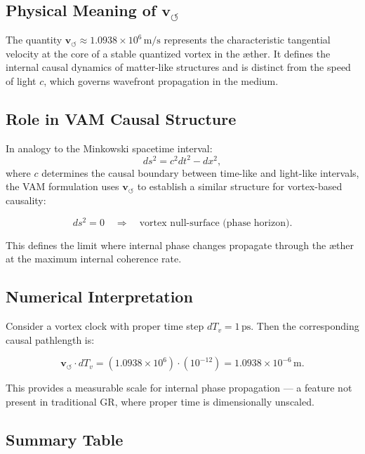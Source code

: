 \documentclass[12pt]{article}
\begin{document}
    \subsection*{Physical Meaning of \( \mathbf{v}_{\scriptscriptstyle\boldsymbol{\circlearrowleft}} \)}

    The quantity \( \mathbf{v}_{\scriptscriptstyle\boldsymbol{\circlearrowleft}} \approx 1.0938 \times 10^6 \, \text{m/s} \) represents the characteristic tangential velocity at the core of a stable quantized vortex in the æther. It defines the internal causal dynamics of matter-like structures and is distinct from the speed of light \( c \), which governs wavefront propagation in the medium.

    \subsection*{Role in VAM Causal Structure}

    In analogy to the Minkowski spacetime interval:
    \[
        ds^2 = c^2 dt^2 - dx^2,
    \]
    where \( c \) determines the causal boundary between time-like and light-like intervals, the VAM formulation uses \( \mathbf{v}_{\scriptscriptstyle\boldsymbol{\circlearrowleft}} \) to establish a similar structure for vortex-based causality:

    \[
        ds^2 = 0 \quad \Rightarrow \quad \text{vortex null-surface (phase horizon)}.
    \]

    This defines the limit where internal phase changes propagate through the æther at the maximum internal coherence rate.

    \subsection*{Numerical Interpretation}

    Consider a vortex clock with proper time step \( dT_v = 1 \, \text{ps} \). Then the corresponding causal pathlength is:

    \[
        \mathbf{v}_{\scriptscriptstyle\boldsymbol{\circlearrowleft}} \cdot dT_v = (1.0938 \times 10^6)\cdot(10^{-12}) = 1.0938 \times 10^{-6} \, \text{m}.
    \]

    This provides a measurable scale for internal phase propagation — a feature not present in traditional GR, where proper time is dimensionally unscaled.

    \subsection*{Summary Table}
\end{document}
